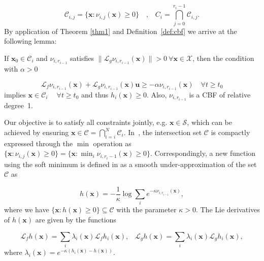 \small
\begin{equation}\label{ccbf2}
    \mathcal{C}_{i,j} = \{\mathbf{x} : \nu_{i,j}(\mathbf{x}) \geq 0\} \quad \text{,} \quad C_i = \bigcap_{j=0}^{r_i-1} \mathcal{C}_{i,j}.
\end{equation}
\normalsize
By application of Theorem \ref{thm1} and Definition~\ref{def:cbf} we arrive at the following lemma:
\begin{lemma}\label{lemma1}
If $\mathbf{x}_0 \in \mathcal{C}_i$ and $\nu_{i,r_{i-1}}$ satisfies $\|\mathcal{L}_g \nu_{i,r_{i-1}}(\mathbf{x})\|>0~ \forall \mathbf{x} \in \mathcal{X}$, then the condition with $\alpha > 0$

\small
\begin{equation}\label{ccbf3}
    \mathcal{L}_f \nu_{i,r_{i-1}}(\mathbf{x}) + \mathcal{L}_g \nu_{i,r_{i-1}}(\mathbf{x}) \mathbf{u} \geq -\alpha \nu_{i,r_{i-1}}(\mathbf{x}) \quad \forall t \geq t_0
\end{equation}
\normalsize
implies $\mathbf{x} \in \mathcal{C}_i \quad~ \forall t \geq t_0$ and thus $h_i(\mathbf{x})\geq0$. Also, $\nu_{i,r_{i-1}}$ is a CBF of relative degree~1.
\end{lemma}

Our objective is to satisfy all constraints jointly, e.g. $\mathbf{x} \in \mathcal{S}$, which can be achieved by ensuring $\mathbf{x} \in \mathcal{C} = \bigcap_{i=i}^{N} \mathcal{C}_{i}$. In~\cite{compositeCBFames}, the intersection set $\mathcal{C}$ is compactly expressed through the $\min$ operation as $\{\mathbf{x} : \nu_{i,j}(\mathbf{x}) \geq 0\} = \{\mathbf{x} : \min_i \nu_{i,r_{i}-1}(\mathbf{x}) \geq 0\}$. Correspondingly, a new function using the soft minimum is defined in \cite{compositeCBFames} as a smooth under-approximation of the set $\mathcal{C}$ as

\begin{equation}\label{ccbf}
    h(\mathbf{x}) = - \frac{1}{\kappa} \log \sum_i e^{-\kappa \nu_{i,r_{i-1}}(\mathbf{x})},
\end{equation}
where we have $\{\mathbf{x} : h(\mathbf{x}) \geq 0\} \subseteq \mathcal{C}$ with the parameter $\kappa > 0$. The Lie derivatives of $h(\mathbf{x})$ are given by the functions

\small
\begin{equation}
    \mathcal{L}_f h(\mathbf{x}) = \sum_i \lambda_i(\mathbf{x}) \mathcal{L}_f h_i(\mathbf{x}) \text{,} \quad
    \mathcal{L}_g h(\mathbf{x}) = \sum_i \lambda_i(\mathbf{x}) \mathcal{L}_g h_i(\mathbf{x}),
\end{equation}
\normalsize
where $\lambda_i(\mathbf{x}) = e ^ {-\kappa (h_i(\mathbf{x}) - h(\mathbf{x}) )}$.

